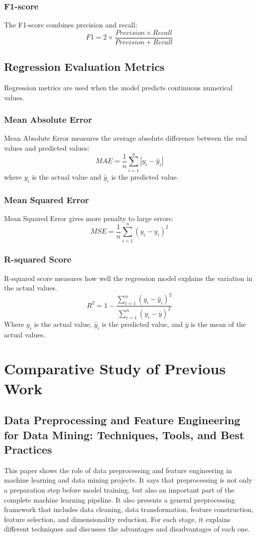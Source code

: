 \documentclass[12pt,a4paper]{report}
\begin{document}
\subsubsection{F1-score}
The F1-score combines precision and recall:
\[
F1 = 2 \times \frac{Precision \times Recall}{Precision + Recall}
\]

\subsection{Regression Evaluation Metrics}
Regression metrics are used when the model predicts continuous numerical values.

\subsubsection{Mean Absolute Error}
Mean Absolute Error measures the average absolute difference between the real
values and predicted values:
\[
MAE = \frac{1}{n}\sum_{i=1}^{n}|y_i - \hat{y}_i|
\]
where $y_i$ is the actual value and $\hat{y}_i$ is the predicted value.

\subsubsection{Mean Squared Error}
Mean Squared Error gives more penalty to large errors:
\[
MSE = \frac{1}{n}\sum_{i=1}^{n}(y_i - \hat{y}_i)^2
\]

\subsubsection{R-squared Score}
R-squared score measures how well the regression model explains the variation in the actual values. 
\[
R^2 = 1 - \frac{\sum_{i=1}^{n}(y_i - \hat{y}_i)^2}{\sum_{i=1}^{n}(y_i - \bar{y})^2}
\]
Where $y_i$ is the actual value, $\hat{y}_i$ is the predicted value, and $\bar{y}$ is the mean of the actual values.

\section{Comparative Study of Previous Work}
\mbox{}

\subsection{Data Preprocessing and Feature Engineering for Data Mining:
Techniques, Tools, and Best Practices ~\cite{preprocessing_feature_engineering}}
This paper shows the role of data preprocessing and feature engineering in
machine learning and data mining projects. It says that preprocessing is not
only a preparation step before model training, but also an important part of the
complete machine learning pipeline. It also presents a general preprocessing framework that includes data
cleaning, data transformation, feature construction, feature selection, and
dimensionality reduction. For each stage, it explains different techniques and
discusses the advantages and disadvantages of each one.
\end{document}
